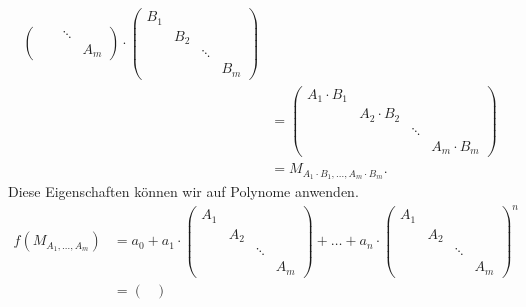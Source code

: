 \documentclass{article}
\theoremstyle{definition}
\begin{document}
\begin{enumerate}[(a)]
\begin{align*}
\begin{pmatrix}
                      &     & \ddots &     \\
                      &     &        & A_m
              \end{pmatrix} \cdot \begin{pmatrix}
                  B_1 &     &        &     \\
                      & B_2 &        &     \\
                      &     & \ddots &     \\
                      &     &        & B_m
              \end{pmatrix} \\
                                                        & = \begin{pmatrix}
                  A_1\cdot B_1 &              &        &              \\
                               & A_2\cdot B_2 &        &              \\
                               &              & \ddots &              \\
                               &              &        & A_m\cdot B_m
              \end{pmatrix}                                 \\
                                                        & = M_{A_1\cdot B_1, \dots, A_m\cdot B_m}.
          \end{align*}
          Diese Eigenschaften können wir auf Polynome anwenden.
          \begin{align*}
              f(M_{A_1,\dots,A_m}) & = a_ 0 + a_1\cdot \begin{pmatrix}
                  A_1 &     &        &     \\
                      & A_2 &        &     \\
                      &     & \ddots &     \\
                      &     &        & A_m
              \end{pmatrix} + \dots + a_n\cdot\begin{pmatrix}
                  A_1 &     &        &     \\
                      & A_2 &        &     \\
                      &     & \ddots &     \\
                      &     &        & A_m
              \end{pmatrix}^n \\
                                   & = \begin{pmatrix}

\end{pmatrix}
\end{align*}
\end{enumerate}
\end{document}
